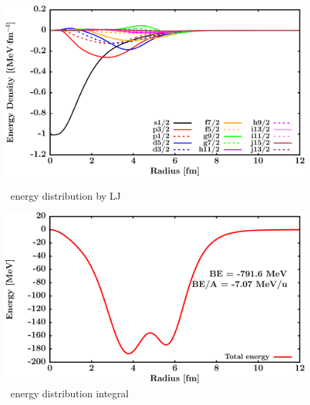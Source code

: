 \begin{figure}[hbtp]
    \centering
    \begin{minipage}{0.45\textwidth}
        \centering
        \includegraphics[width=\textwidth]{figures/sn112_EnergyDist.png}
        \caption*{\snTwelve\ energy distribution by LJ}
        \label{DOMFitData_sn112_proton_energyDistInt}
    \end{minipage}\hspace{6pt}
    \begin{minipage}{0.45\textwidth}
        \centering
        \includegraphics[width=\textwidth]{figures/sn112_EnergyDistIntegral.png}
        \caption*{\snTwelve\ energy distribution integral}
        \label{DOMFitData_sn112_neutron_energyDistInt}
    \end{minipage}
\end{figure}
\vspace{0.4in}
